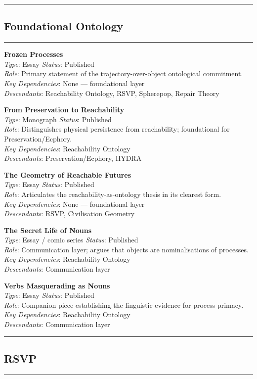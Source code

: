 \documentclass[12pt, twoside]{article}
\begin{document}
\newcommand{\corpusitem}[6]{%
  \item \textbf{#1}\\
  \textit{Type}: #2 \quad \textit{Status}: #3\\
  \textit{Role}: #4\\
  \textit{Key Dependencies}: #5\\
  \textit{Descendants}: #6
}

\medskip
\noindent\textcolor{rsvpblue}{\rule{\linewidth}{0.8pt}}
\subsection*{Foundational Ontology}
\noindent\textcolor{rsvpblue}{\rule{\linewidth}{0.4pt}}

\begin{list}{}{\leftmargin=0pt \itemindent=0pt \itemsep=6pt}

\corpusitem{Frozen Processes}{Essay}{Published}{Primary statement of the trajectory-over-object ontological commitment.}{None --- foundational layer}{Reachability Ontology, RSVP, Spherepop, Repair Theory}

\corpusitem{From Preservation to Reachability}{Monograph}{Published}{Distinguishes physical persistence from reachability; foundational for Preservation/Ecphory.}{Reachability Ontology}{Preservation/Ecphory, HYDRA}

\corpusitem{The Geometry of Reachable Futures}{Essay}{Published}{Articulates the reachability-as-ontology thesis in its clearest form.}{None --- foundational layer}{RSVP, Civilisation Geometry}

\corpusitem{The Secret Life of Nouns}{Essay / comic series}{Published}{Communication layer; argues that objects are nominalisations of processes.}{Reachability Ontology}{Communication layer}

\corpusitem{Verbs Masquerading as Nouns}{Essay}{Published}{Companion piece establishing the linguistic evidence for process primacy.}{Reachability Ontology}{Communication layer}

\end{list}

\medskip
\noindent\textcolor{rsvpblue}{\rule{\linewidth}{0.4pt}}
\subsection*{RSVP}
\noindent\textcolor{rsvpblue}{\rule{\linewidth}{0.4pt}}
\end{document}
